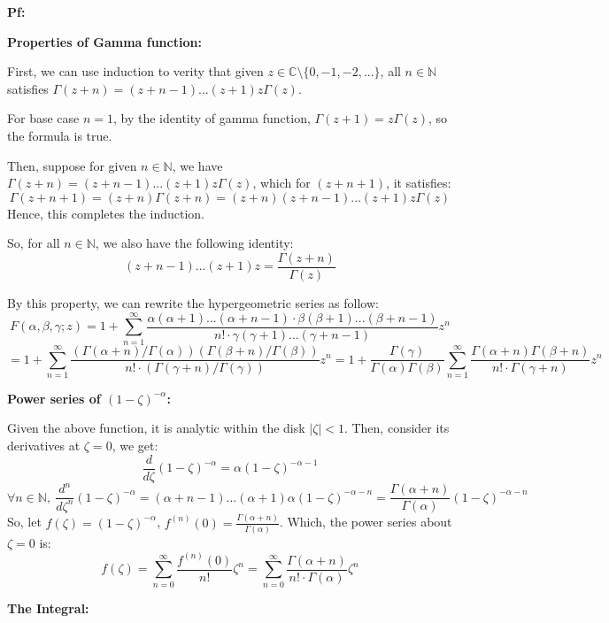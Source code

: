 \documentclass{article}
\begin{document}
\textbf{Pf:}

\textbf{Properties of Gamma function:}

First, we can use induction to verity that given $z\in \mathbb{C}\setminus\{0,-1,-2,...\}$, all $n\in\mathbb{N}$ satisfies $\Gamma(z+n)=(z+n-1)...(z+1)z\Gamma(z)$. 

For base case $n=1$, by the identity of gamma function, $\Gamma(z+1)=z\Gamma(z)$, so the formula is true.

Then, suppose for given $n\in\mathbb{N}$, we have $\Gamma(z+n)=(z+n-1)...(z+1)z\Gamma(z)$, which for $(z+n+1)$, it satisfies:
$$\Gamma(z+n+1)=(z+n)\Gamma(z+n)=(z+n)(z+n-1)...(z+1)z\Gamma(z)$$
Hence, this completes the induction.

So, for all $n\in\mathbb{N}$, we also have the following identity:
$$(z+n-1)...(z+1)z = \frac{\Gamma(z+n)}{\Gamma(z)}$$

By this property, we can rewrite the hypergeometric series as follow:
$$F(\alpha,\beta,\gamma;z)=1+\sum_{n=1}^{\infty}\frac{\alpha(\alpha+1)...(\alpha+n-1)\cdot \beta(\beta+1)...(\beta+n-1)}{n!\cdot \gamma(\gamma+1)...(\gamma+n-1)}z^n $$
$$= 1+\sum_{n=1}^{\infty}\frac{(\Gamma(\alpha+n)/\Gamma(\alpha))(\Gamma(\beta+n)/\Gamma(\beta))}{n!\cdot (\Gamma(\gamma+n)/\Gamma(\gamma))}z^n = 1+\frac{\Gamma(\gamma)}{\Gamma(\alpha)\Gamma(\beta)}\sum_{n=1}^{\infty}\frac{\Gamma(\alpha+n)\Gamma(\beta+n)}{n!\cdot \Gamma(\gamma+n)}z^n$$

\hfil

\textbf{Power series of $(1-\zeta)^{-\alpha}$:}

Given the above function, it is analytic within the disk $|\zeta|<1$. Then, consider its derivatives at $\zeta=0$, we get:
$$\frac{d}{d\zeta}(1-\zeta)^{-\alpha}=\alpha(1-\zeta)^{-\alpha-1}$$
$$\forall n\in\mathbb{N},\ \frac{d^n}{d\zeta^n}(1-\zeta)^{-\alpha}=(\alpha+n-1)...(\alpha+1)\alpha(1-\zeta)^{-\alpha-n}=\frac{\Gamma(\alpha+n)}{\Gamma(\alpha)}(1-\zeta)^{-\alpha-n}$$
So, let $f(\zeta)=(1-\zeta)^{-\alpha}$, $f^{(n)}(0)=\frac{\Gamma(\alpha+n)}{\Gamma(\alpha)}$. Which, the power series about $\zeta=0$ is:
$$f(\zeta)=\sum_{n=0}^{\infty}\frac{f^{(n)}(0)}{n!}\zeta^n = \sum_{n=0}^{\infty}\frac{\Gamma(\alpha+n)}{n!\cdot\Gamma(\alpha)}\zeta^n$$

\hfil

\textbf{The Integral:}
\end{document}
